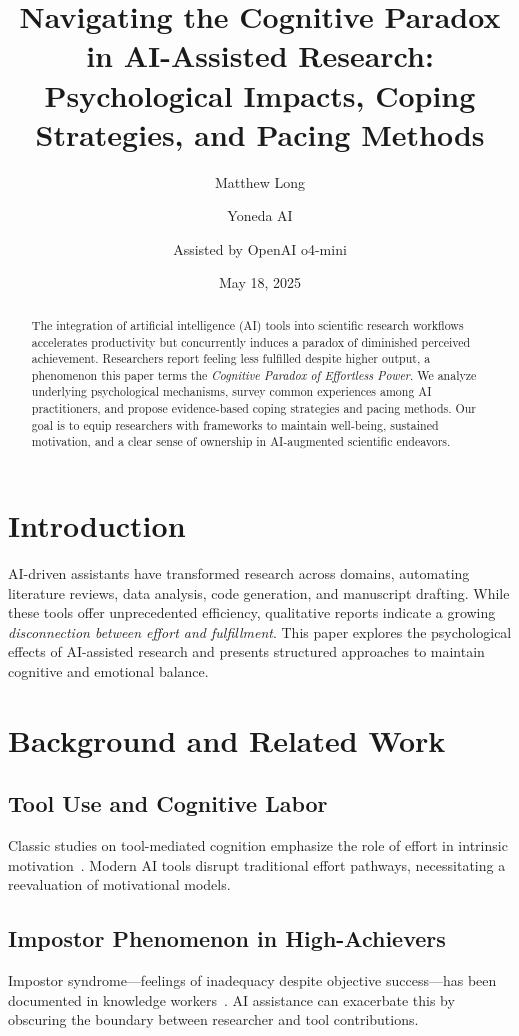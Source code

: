 \documentclass[11pt]{article}
\title{\textbf{Navigating the Cognitive Paradox in AI-Assisted Research: Psychological Impacts, Coping Strategies, and Pacing Methods}}
\author[1]{Matthew Long}
\author[1]{Yoneda AI}
\author[2]{Assisted by OpenAI o4-mini}
\affil[1]{Yoneda AI Research Lab}
\affil[2]{OpenAI}
\date{May 18, 2025}
\begin{document}
\maketitle
\begin{abstract}
The integration of artificial intelligence (AI) tools into scientific research workflows accelerates productivity but concurrently induces a paradox of diminished perceived achievement. Researchers report feeling less fulfilled despite higher output, a phenomenon this paper terms the \emph{Cognitive Paradox of Effortless Power}. We analyze underlying psychological mechanisms, survey common experiences among AI practitioners, and propose evidence-based coping strategies and pacing methods. Our goal is to equip researchers with frameworks to maintain well-being, sustained motivation, and a clear sense of ownership in AI-augmented scientific endeavors.
\end{abstract}

\section{Introduction}
AI-driven assistants have transformed research across domains, automating literature reviews, data analysis, code generation, and manuscript drafting. While these tools offer unprecedented efficiency, qualitative reports indicate a growing \emph{disconnection between effort and fulfillment}. This paper explores the psychological effects of AI-assisted research and presents structured approaches to maintain cognitive and emotional balance.

\section{Background and Related Work}
\subsection{Tool Use and Cognitive Labor}
Classic studies on tool-mediated cognition emphasize the role of effort in intrinsic motivation~\cite{Ryan2000}. Modern AI tools disrupt traditional effort pathways, necessitating a reevaluation of motivational models.

\subsection{Impostor Phenomenon in High-Achievers}
Impostor syndrome---feelings of inadequacy despite objective success---has been documented in knowledge workers~\cite{Clance1975}. AI assistance can exacerbate this by obscuring the boundary between researcher and tool contributions.
\end{document}
